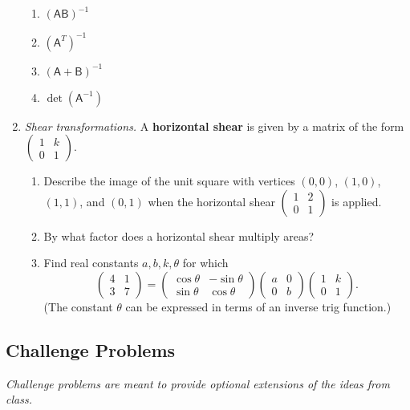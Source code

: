 \begin{enumerate}
\begin{enumerate}
\item $(\mathsf{AB})^{-1}$
\item $(\mathsf{A}^T)^{-1}$
\item $(\mathsf{A} + \mathsf{B})^{-1}$
\item $\det(\mathsf{A}^{-1})$
\end{enumerate}
\item \emph{Shear transformations.} A \textbf{horizontal shear} is given by a matrix of the form $\begin{pmatrix} 1 & k \\ 0 & 1 \end{pmatrix}$.
\begin{enumerate}
\item Describe the image of the unit square with vertices $(0,0)$, $(1,0)$, $(1,1)$, and $(0,1)$ when the horizontal shear $\begin{pmatrix} 1 & 2 \\ 0 & 1 \end{pmatrix}$ is applied.
\item By what factor does a horizontal shear multiply areas?
\item Find real constants $a,b,k,\theta$ for which
\begin{equation*}
\begin{pmatrix} 4 & 1 \\ 3 & 7 \end{pmatrix} = \begin{pmatrix} \cos\theta & -\sin\theta \\ \sin\theta & \cos\theta \end{pmatrix}\begin{pmatrix} a & 0 \\ 0 & b \end{pmatrix}\begin{pmatrix} 1 & k \\ 0 & 1 \end{pmatrix}.
\end{equation*}
(The constant $\theta$ can be expressed in terms of an inverse trig function.)
\end{enumerate}
\end{enumerate}


\newpage
\subsection{Challenge Problems}

\emph{Challenge problems are meant to provide optional extensions of the ideas from class.}

